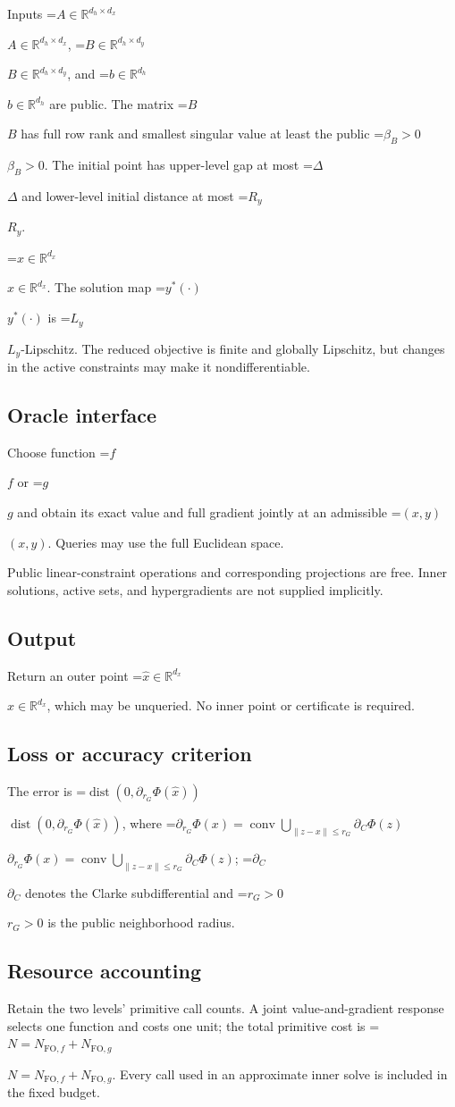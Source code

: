 \documentclass[10pt,a4paper]{article}
\newcommand{\AtlasMath}[1]{\par\begingroup\centering\setbox0=\hbox{$\displaystyle #1$}\ifdim\wd0>1.4\linewidth\typeout{ATLAS WIDE FORMULA: \the\wd0}\fi\ifdim\wd0>\linewidth\resizebox{\linewidth}{!}{\box0}\else\box0\fi\par\endgroup}
\newcommand{\AtlasInlineMath}[1]{\begingroup\setbox0=\hbox{$#1$}\ifdim\wd0>.4\linewidth\endgroup\AtlasMath{#1}\else\endgroup$#1$\fi}
\begin{document}
Inputs \AtlasInlineMath{A\in\mathbb{R}^{d_h\times d_x}}, \AtlasInlineMath{B\in\mathbb{R}^{d_h\times d_y}}, and \AtlasInlineMath{b\in\mathbb{R}^{d_h}} are public. The matrix \AtlasInlineMath{B} has full row rank and smallest singular value at least the public \AtlasInlineMath{\beta_B>0}. The initial point has upper-level gap at most \AtlasInlineMath{\Delta} and lower-level initial distance at most \AtlasInlineMath{R_y}.

\AtlasInlineMath{x\in\mathbb{R}^{d_x}}. The solution map \AtlasInlineMath{y^*(\cdot)} is \AtlasInlineMath{L_y}-Lipschitz. The reduced objective is finite and globally Lipschitz, but changes in the active constraints may make it nondifferentiable.

\subsection{Oracle interface}
Choose function \AtlasInlineMath{f} or \AtlasInlineMath{g} and obtain its exact value and full gradient jointly at an admissible \AtlasInlineMath{(x,y)}. Queries may use the full Euclidean space.

Public linear-constraint operations and corresponding projections are free. Inner solutions, active sets, and hypergradients are not supplied implicitly.

\subsection{Output}
Return an outer point \AtlasInlineMath{\widehat{x}\in \mathbb{R}^{d_x}}, which may be unqueried. No inner point or certificate is required.

\subsection{Loss or accuracy criterion}
The error is \AtlasInlineMath{\operatorname{dist}(0,\partial_{r_G}\Phi(\widehat{x}))}, where \AtlasInlineMath{\partial_{r_G}\Phi(x)=\operatorname{conv}\bigcup_{\|z-x\|\le r_G}\partial_C\Phi(z)}; \AtlasInlineMath{\partial_C} denotes the Clarke subdifferential and \AtlasInlineMath{r_G>0} is the public neighborhood radius.

\subsection{Resource accounting}
Retain the two levels' primitive call counts. A joint value-and-gradient response selects one function and costs one unit; the total primitive cost is \AtlasInlineMath{N=N_{\mathrm{FO},f}+N_{\mathrm{FO},g}}. Every call used in an approximate inner solve is included in the fixed budget.
\end{document}
